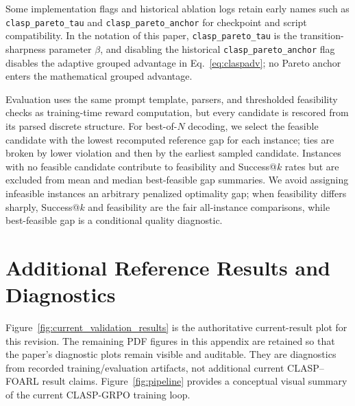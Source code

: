 \documentclass{article}
\theoremstyle{remark}
\begin{document}
Some implementation flags and historical ablation logs retain early names such as \texttt{clasp\_pareto\_tau} and \texttt{clasp\_pareto\_anchor} for checkpoint and script compatibility. In the notation of this paper, \texttt{clasp\_pareto\_tau} is the transition-sharpness parameter \(\beta\), and disabling the historical \texttt{clasp\_pareto\_anchor} flag disables the adaptive grouped advantage in Eq.~\eqref{eq:claspadv}; no Pareto anchor enters the mathematical grouped advantage.

Evaluation uses the same prompt template, parsers, and thresholded feasibility checks as training-time reward computation, but every candidate is rescored from its parsed discrete structure. For best-of-\(N\) decoding, we select the feasible candidate with the lowest recomputed reference gap for each instance; ties are broken by lower violation and then by the earliest sampled candidate. Instances with no feasible candidate contribute to feasibility and Success@\(k\) rates but are excluded from mean and median best-feasible gap summaries. We avoid assigning infeasible instances an arbitrary penalized optimality gap; when feasibility differs sharply, Success@\(k\) and feasibility are the fair all-instance comparisons, while best-feasible gap is a conditional quality diagnostic.

\clearpage
\section{Additional Reference Results and Diagnostics}
\label{app:additional_results}

Figure~\ref{fig:current_validation_results} is the authoritative current-result
plot for this revision. The remaining PDF figures in this appendix are retained
so that the paper's diagnostic plots remain visible and auditable. They are
diagnostics from recorded training/evaluation artifacts, not additional current
CLASP--FOARL result claims. Figure~\ref{fig:pipeline} provides a conceptual
visual summary of the current CLASP-GRPO training loop.
\end{document}
